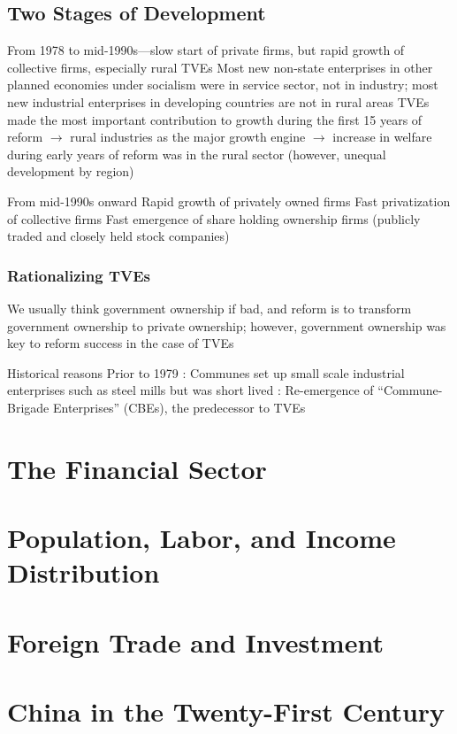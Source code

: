\documentclass[11pt]{article}
\theoremstyle{definition}
\theoremstyle{remark}
\begin{document}
\subsection{Two Stages of Development}
\begin{outline}[enumerate]
\1 From 1978 to mid-1990s---slow start of private firms, but rapid growth of collective firms, especially rural TVEs
	\2 Most new non-state enterprises in other planned economies under socialism were in service sector, not in industry; most new industrial enterprises in developing countries are not in rural areas 
	\2 TVEs made the most important contribution to growth during the first 15 years of reform $\to$ rural industries as the major growth engine $\to$ increase in welfare during early years of reform was in the rural sector (however, unequal development by region)
	
	
\1 From mid-1990s onward
	\2 Rapid growth of privately owned firms
	\2 Fast privatization of collective firms
	\2 Fast emergence of share holding ownership firms (publicly traded and closely held stock companies)
\end{outline}

\subsubsection{Rationalizing TVEs}
We usually think government ownership if bad, and reform is to transform government ownership to private ownership; however, government ownership was key to reform success in the case of TVEs
\begin{outline}[enumerate]
\1 Historical reasons
	\2 Prior to 1979
		: Communes set up small scale industrial enterprises such as steel mills but was short lived
		: Re-emergence of ``Commune-Brigade Enterprises'' (CBEs), the predecessor to TVEs
\end{outline}


\section{The Financial Sector}

\section{Population, Labor, and Income Distribution}

\section{Foreign Trade and Investment}

\section{China in the Twenty-First Century}
\end{document}
